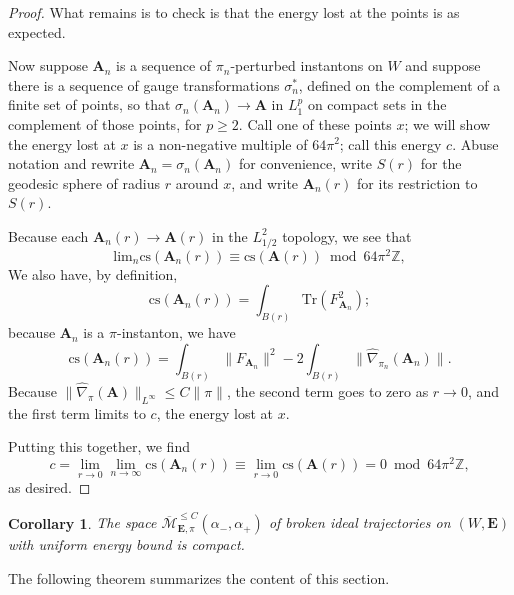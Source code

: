 \documentclass{memo-l}
\newtheorem{corollary}[theorem]{Corollary}
\theoremstyle{definition}
\theoremstyle{remark}
\numberwithin{section}{chapter}
\numberwithin{equation}{chapter}
\begin{document}
\begin{proof}
What remains is to check is that the energy lost at the points is as expected.

Now suppose $\mathbf{A}_n$ is a sequence of $\pi_n$-perturbed instantons on $W$ and suppose there is a sequence of gauge transformations $\sigma_n^*$, defined on the complement of a finite set of points, so that $\sigma_n(\mathbf{A}_n) \to \mathbf{A}$ in $L^p_1$ on compact sets in the complement of those points, for $p \geq 2$. Call one of these points $x$; we will show the energy lost at $x$ is a non-negative multiple of $64\pi^2$; call this energy $c$. Abuse notation and rewrite $\mathbf{A}_n = \sigma_n(\mathbf{A}_n)$ for convenience, write $S(r)$ for the geodesic sphere of radius $r$ around $x$, and write $\mathbf{A}_n(r)$ for its restriction to $S(r)$. 

Because each $\mathbf{A}_n(r) \to \mathbf{A}(r)$ in the $L^2_{1/2}$ topology, we see that 
$$\text{lim}_n \text{cs}(\mathbf{A}_n(r)) \equiv \text{cs}(\mathbf{A}(r)) \bmod 64\pi^2 \mathbb Z,$$ 
We also have, by definition, 
$$\text{cs}(\mathbf{A}_n(r)) = \int_{B(r)} \text{Tr}\left(F_{\mathbf{A}_n}^2\right);$$ 
because $\mathbf{A}_n$ is a $\pi$-instanton, we have 
$$\text{cs}(\mathbf{A}_n(r)) = \int_{B(r)} \|F_{\mathbf{A}_n}\|^2 -2\int_{B(r)} \|\widehat{\nabla}_{\pi_n}(\mathbf{A}_n)\|.$$ 
Because $\|\widehat{\nabla}_\pi(\mathbf{A})\|_{L^\infty} \leq C\|\pi\|$, the second term goes to zero as $r \to 0$, and the first term limits to $c$, the energy lost at $x$. 

Putting this together, we find 
$$c = \lim_{r \to 0} \lim_{n \to \infty} \text{cs}(\mathbf{A}_n(r)) \equiv \lim_{r \to 0} \text{cs}(\mathbf{A}(r)) = 0 \bmod 64\pi^2 \mathbb Z,$$
as desired. 
\end{proof}

\begin{corollary}The space $\overline{\mathcal M}^{\leq C}_{\mathbf{E},\pi}(\alpha_-, \alpha_+)$ of broken ideal trajectories on $(W,\mathbf{E})$ with uniform energy bound is compact.
\end{corollary}

The following theorem summarizes the content of this section. 
\end{document}

